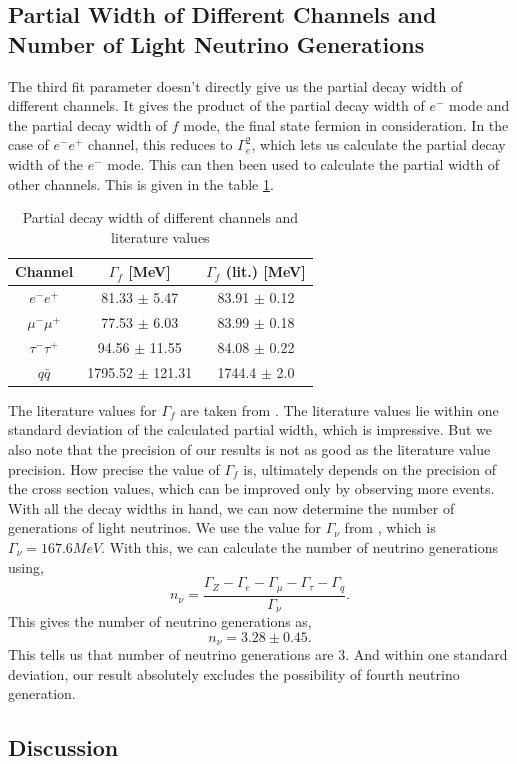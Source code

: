 \subsection{Partial Width of Different Channels and Number of Light Neutrino Generations}
The third fit parameter doesn't directly give us the partial decay width of different channels. It gives the product of the partial decay width of $e^-$ mode and the partial decay width of $f$ mode, the final state fermion in consideration. In the case of $e^-e^+$ channel, this reduces to $\Gamma_e^2$, which lets us calculate the partial decay width of the $e^-$ mode. This can then been used to calculate the partial width of other channels. This is given in the table \ref{table:decaywidth}.\\
\begin{table}[h!]
\centering
\begin{tabular}{c|cc}
\hline
Channel        & $\Gamma_f$ {[}MeV{]} & $\Gamma_f$ (lit.) {[}MeV{]} \\ \hline
$e^-e^+$       & 81.33 $\pm$ 5.47     & 83.91 $\pm$ 0.12              \\
$\mu^-\mu^+$   & 77.53 $\pm$ 6.03     & 83.99 $\pm$ 0.18              \\
$\tau^-\tau^+$ & 94.56 $\pm$ 11.55    & 84.08 $\pm$ 0.22              \\
$q\bar{q}$     & 1795.52 $\pm$ 121.31 & 1744.4 $\pm$ 2.0              \\ \hline
\end{tabular}
\caption{Partial decay width of different channels and literature values}
\label{table:decaywidth}
\end{table}
The literature values for $\Gamma_f$ are taken from \cite{pdg2}. The literature values lie within one standard deviation of the calculated partial width, which is impressive. But we also note that the precision of our results is not as good as the literature value precision. How precise the value of $\Gamma_f$ is, ultimately depends on the precision of the cross section values, which can be improved only by observing more events.\\
With all the decay widths in hand, we can now determine the number of generations of light neutrinos. We use the value for $\Gamma_{\nu}$ from \cite{UB}, which is $\Gamma_{\nu} = 167.6 MeV$. With this, we can calculate the number of neutrino generations using,
\begin{equation}
    n_{\nu} = \frac{\Gamma_Z - \Gamma_e - \Gamma_{\mu} - \Gamma_{\tau} - \Gamma_q}{\Gamma_{\nu}}.
\end{equation}
This gives the number of neutrino generations as,
\begin{equation}
    n_{\nu} = 3.28 \pm 0.45.
\end{equation}
This tells us that number of neutrino generations are $3$. And within one standard deviation, our result absolutely excludes the possibility of fourth neutrino generation.

\subsection{Discussion}